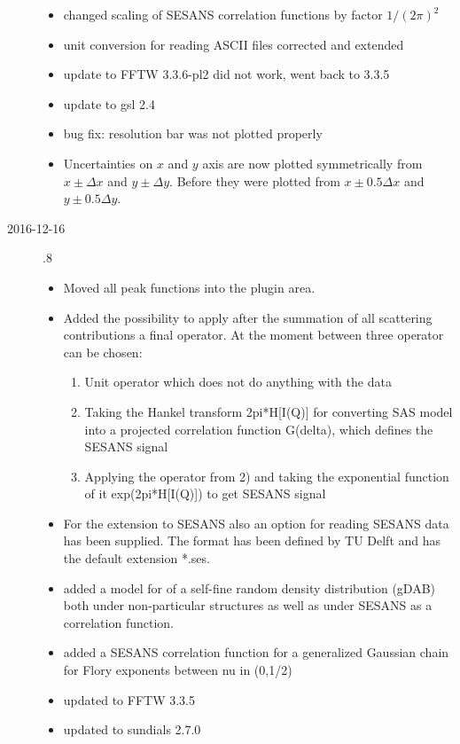\begin{description}
\begin{itemize}
    \item changed scaling of SESANS correlation functions by factor $1/(2\pi)^2$
    \item unit conversion for reading ASCII files corrected and extended
    \item update to FFTW 3.3.6-pl2 did not work, went back to 3.3.5
    \item update to gsl 2.4
    \item bug fix: resolution bar was not plotted properly
    \item Uncertainties on $x$ and $y$ axis are now plotted symmetrically from $x\pm\Delta x$ and $y\pm\Delta y$.
          Before they were plotted from $x\pm0.5\Delta x$ and $y\pm0.5\Delta y$.
    \end{itemize}
\item[2016-12-16] .8
    \begin{itemize}
        \item Moved all peak functions into the plugin area.
        \item Added the possibility to apply after the summation of all scattering contributions a final operator.  At the moment between three operator can be chosen:
        \begin{enumerate}
            \item Unit operator which does not do anything with the data
            \item Taking the Hankel transform 2pi*H[I(Q)] for converting SAS model into a projected correlation function G(delta), which defines the SESANS signal
            \item Applying the operator from 2) and taking the exponential function of it exp(2pi*H[I(Q)]) to get SESANS signal
        \end{enumerate}
        \item For the extension to SESANS also an option for reading SESANS data has been supplied. The format has been defined by TU Delft and has the default extension *.ses.
        \item added a model for of a self-fine random density distribution (gDAB) both under non-particular  structures as well as under SESANS as a correlation function.
        \item added a SESANS correlation function for a generalized Gaussian chain for Flory exponents between nu in (0,1/2)
        \item updated to FFTW 3.3.5
        \item updated to sundials 2.7.0

\end{itemize}
\end{description}
